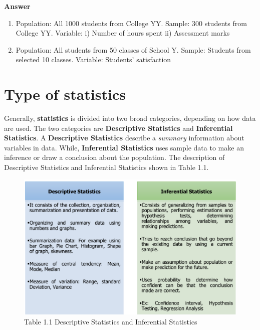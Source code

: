 \documentclass[
  a4paper,
  DIV=11,
  numbers=noendperiod,
  oneside]{scrreprt}
\begin{document}
{\textbf{Answer}}

\begin{enumerate}
\def\labelenumi{\alph{enumi})}
\item
  Population: All 1000 students from College YY. Sample: 300 students
  from College YY. Variable: i) Number of hours spent ii) Assessment
  marks
\item
  Population: All students from 50 classes of School Y. Sample: Students
  from selected 10 classes. Variable: Students' satisfaction
\end{enumerate}

\hypertarget{type-of-statistics}{%
\section{Type of statistics}\label{type-of-statistics}}

Generally, \textbf{statistics} is divided into two broad categories,
depending on how data are used. The two categories are
\textbf{Descriptive Statistics} and \textbf{Inferential Statistics}. A
\textbf{Descriptive Statistics} describe a \emph{summary} information
about variables in data. While, \textbf{Inferential Statistics} uses
sample data to make an inference or draw a conclusion about the
population. The description of Descriptive Statistics and Inferential
Statistics shown in Table 1.1.

\begin{figure}

{\centering \includegraphics[width=5.20833in,height=\textheight]{images/ch1/Picture5.png}

}

\caption{Table 1.1 Descriptive Statistics and Inferential Statistics}

\end{figure}
\end{document}
